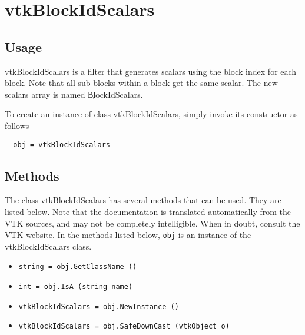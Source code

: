 \section{vtkBlockIdScalars}

\subsection{Usage}

 vtkBlockIdScalars is a filter that generates scalars using the block index
 for each block. Note that all sub-blocks within a block get the same scalar.
 The new scalars array is named \c BlockIdScalars.

To create an instance of class vtkBlockIdScalars, simply
invoke its constructor as follows
\begin{verbatim}
  obj = vtkBlockIdScalars
\end{verbatim}
\subsection{Methods}

The class vtkBlockIdScalars has several methods that can be used.
  They are listed below.
Note that the documentation is translated automatically from the VTK sources,
and may not be completely intelligible.  When in doubt, consult the VTK website.
In the methods listed below, \verb|obj| is an instance of the vtkBlockIdScalars class.
\begin{itemize}
\item  \verb|string = obj.GetClassName ()|

\item  \verb|int = obj.IsA (string name)|

\item  \verb|vtkBlockIdScalars = obj.NewInstance ()|

\item  \verb|vtkBlockIdScalars = obj.SafeDownCast (vtkObject o)|

\end{itemize}
